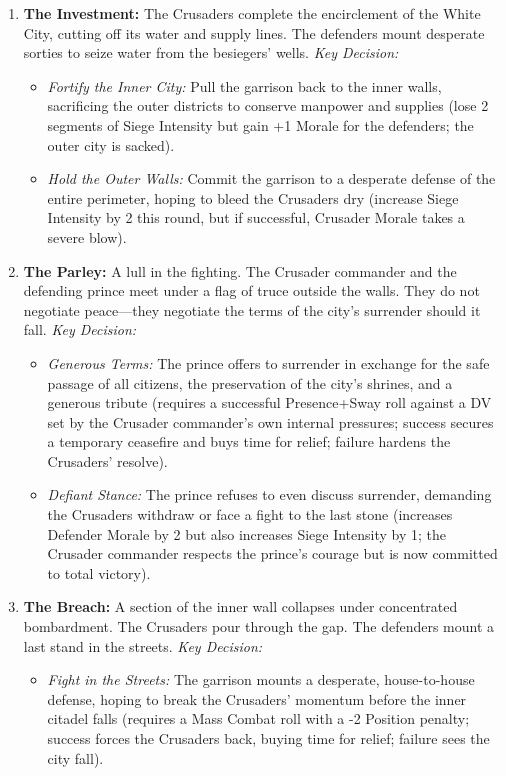 \documentclass[11pt]{article}
\begin{document}
\begin{enumerate}
    \item \textbf{The Investment:} The Crusaders complete the encirclement of the White City, cutting off its water and supply lines. The defenders mount desperate sorties to seize water from the besiegers' wells. \textit{Key Decision:}
    \begin{itemize}
        \item \textit{Fortify the Inner City:} Pull the garrison back to the inner walls, sacrificing the outer districts to conserve manpower and supplies (lose 2 segments of Siege Intensity but gain +1 Morale for the defenders; the outer city is sacked).
        \item \textit{Hold the Outer Walls:} Commit the garrison to a desperate defense of the entire perimeter, hoping to bleed the Crusaders dry (increase Siege Intensity by 2 this round, but if successful, Crusader Morale takes a severe blow).
    \end{itemize}
    \item \textbf{The Parley:} A lull in the fighting. The Crusader commander and the defending prince meet under a flag of truce outside the walls. They do not negotiate peace—they negotiate the terms of the city's surrender should it fall. \textit{Key Decision:}
    \begin{itemize}
        \item \textit{Generous Terms:} The prince offers to surrender in exchange for the safe passage of all citizens, the preservation of the city's shrines, and a generous tribute (requires a successful Presence+Sway roll against a DV set by the Crusader commander's own internal pressures; success secures a temporary ceasefire and buys time for relief; failure hardens the Crusaders' resolve).
        \item \textit{Defiant Stance:} The prince refuses to even discuss surrender, demanding the Crusaders withdraw or face a fight to the last stone (increases Defender Morale by 2 but also increases Siege Intensity by 1; the Crusader commander respects the prince's courage but is now committed to total victory).
    \end{itemize}
    \item \textbf{The Breach:} A section of the inner wall collapses under concentrated bombardment. The Crusaders pour through the gap. The defenders mount a last stand in the streets. \textit{Key Decision:}
    \begin{itemize}
        \item \textit{Fight in the Streets:} The garrison mounts a desperate, house-to-house defense, hoping to break the Crusaders' momentum before the inner citadel falls (requires a Mass Combat roll with a -2 Position penalty; success forces the Crusaders back, buying time for relief; failure sees the city fall).

\end{itemize}
\end{enumerate}
\end{document}
